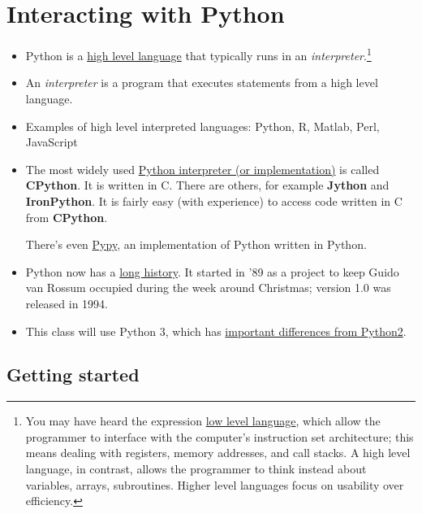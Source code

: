 \documentclass[12pt,letterpaper,twoside]{article}
\begin{document}
\section{Interacting with Python}
\vspace{-8pt}
\begin{itemize}
\item Python is a
  \href{https://en.wikipedia.org/wiki/High-level_programming_language#Features}{high
    level language} that typically runs in an
  \emph{interpreter}.\footnote{You may have heard the expression
    \href{https://en.wikipedia.org/wiki/Low-level_programming_language\#Assembly}{low
      level language}, which allow the programmer to interface with
    the computer's instruction set architecture; this means dealing
    with registers, memory addresses, and call stacks. A high level
    language, in contrast, allows the programmer to think instead
    about variables, arrays, subroutines. Higher level languages focus
    on usability over efficiency.}
\item
  An \emph{interpreter} is a program that
  executes statements from a high level language.
\item
  Examples of high level interpreted languages: Python, R, Matlab, Perl,
  JavaScript
\item
  The most widely used 
  \href{https://docs.python.org/3/reference/introduction.html#alternate-implementations}
  {Python interpreter (or implementation)} 
  is called \textbf{CPython}. It
  is written in C. There are others, for example \textbf{Jython} and
  \textbf{IronPython}. It is fairly easy (with experience) to access
  code written in C from \textbf{CPython}. 

  There's even
  \href{https://pypy.org/}{Pypy},  an implementation of Python written
  in Python.
\item
  Python now has a 
  \href{https://en.wikipedia.org/wiki/Python_(programming_language)#History}{long
    history}.
  It started in '89 as a project to keep Guido van Rossum occupied
  during the week around Christmas; version 1.0 was released in 1994.
\item
  This class will use Python 3, which has 
  \href{https://sebastianraschka.com/Articles/2014_python_2_3_key_diff.html#sections}
  {important differences from Python2}.
\end{itemize}

\vspace{-8pt}
\subsection{Getting started}
\vspace{-8pt}
\end{document}
